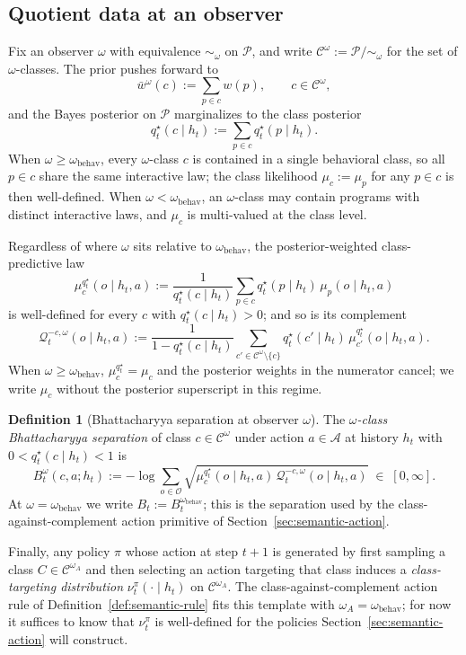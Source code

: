 \documentclass[11pt]{article}
\theoremstyle{definition}
\newtheorem{definition}[theorem]{Definition}
\theoremstyle{remark}
\newcommand{\Acal}{\mathcal{A}}
\newcommand{\Ccal}{\mathcal{C}}
\newcommand{\Ocal}{\mathcal{O}}
\newcommand{\Pcal}{\mathcal{P}}
\newcommand{\Qcal}{\mathcal{Q}}
\begin{document}
\subsection{Quotient data at an observer}
\label{sec:quotient-data}

Fix an observer $\omega$ with equivalence $\sim_\omega$ on $\Pcal$, and write $\Ccal^\omega:=\Pcal/\!\sim_\omega$ for the set of $\omega$-classes. The prior pushes forward to
\[
\bar w^\omega(c):=\sum_{p\in c}w(p),\qquad c\in\Ccal^\omega,
\]
and the Bayes posterior on $\Pcal$ marginalizes to the class posterior
\[
q_t^\star(c\mid h_t):=\sum_{p\in c}q_t^\star(p\mid h_t).
\]
When $\omega\ge\omega_{\mathrm{behav}}$, every $\omega$-class $c$ is contained in a single behavioral class, so all $p\in c$ share the same interactive law; the class likelihood $\mu_c:=\mu_p$ for any $p\in c$ is then well-defined. When $\omega<\omega_{\mathrm{behav}}$, an $\omega$-class may contain programs with distinct interactive laws, and $\mu_c$ is multi-valued at the class level.

Regardless of where $\omega$ sits relative to $\omega_{\mathrm{behav}}$, the posterior-weighted class-predictive law
\[
\mu_c^{q_t^\star}(o\mid h_t,a):=\frac{1}{q_t^\star(c\mid h_t)}\sum_{p\in c}q_t^\star(p\mid h_t)\,\mu_p(o\mid h_t,a)
\]
is well-defined for every $c$ with $q_t^\star(c\mid h_t)>0$; and so is its complement
\[
\Qcal_t^{-c,\omega}(o\mid h_t,a):=\frac{1}{1-q_t^\star(c\mid h_t)}\sum_{c'\in\Ccal^\omega\setminus\{c\}}q_t^\star(c'\mid h_t)\,\mu_{c'}^{q_t^\star}(o\mid h_t,a).
\]
When $\omega\ge\omega_{\mathrm{behav}}$, $\mu_c^{q_t^\star}=\mu_c$ and the posterior weights in the numerator cancel; we write $\mu_c$ without the posterior superscript in this regime.

\begin{definition}[Bhattacharyya separation at observer $\omega$]
\label{def:bhat-omega}
The \emph{$\omega$-class Bhattacharyya separation} of class $c\in\Ccal^\omega$ under action $a\in\Acal$ at history $h_t$ with $0<q_t^\star(c\mid h_t)<1$ is
\[
B_t^\omega(c,a;h_t):=-\log\sum_{o\in\Ocal}\sqrt{\mu_c^{q_t^\star}(o\mid h_t,a)\,\Qcal_t^{-c,\omega}(o\mid h_t,a)}\;\in\;[0,\infty].
\]
At $\omega=\omega_{\mathrm{behav}}$ we write $B_t:=B_t^{\omega_{\mathrm{behav}}}$; this is the separation used by the class-against-complement action primitive of Section~\ref{sec:semantic-action}.
\end{definition}

Finally, any policy $\pi$ whose action at step $t+1$ is generated by first sampling a class $C\in\Ccal^{\omega_A}$ and then selecting an action targeting that class induces a \emph{class-targeting distribution} $\nu_t^\pi(\cdot\mid h_t)$ on $\Ccal^{\omega_A}$. The class-against-complement action rule of Definition~\ref{def:semantic-rule} fits this template with $\omega_A=\omega_{\mathrm{behav}}$; for now it suffices to know that $\nu_t^\pi$ is well-defined for the policies Section~\ref{sec:semantic-action} will construct.
\end{document}
